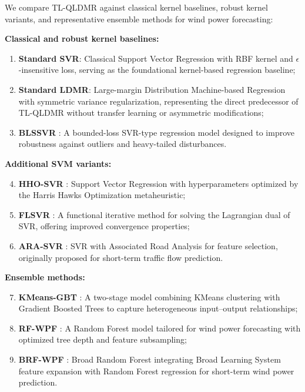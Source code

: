 We compare TL-QLDMR against classical kernel baselines, robust kernel variants, and representative ensemble methods for wind power forecasting:

\textbf{Classical and robust kernel baselines:}
\begin{enumerate}
    \item \textbf{Standard SVR}: Classical Support Vector Regression with RBF kernel and $\epsilon$-insensitive loss, serving as the foundational kernel-based regression baseline;
    \item \textbf{Standard LDMR}: Large-margin Distribution Machine-based Regression with symmetric variance regularization, representing the direct predecessor of TL-QLDMR without transfer learning or asymmetric modifications;
    \item \textbf{BLSSVR} \citep{fu2023bounded}: A bounded-loss SVR-type regression model designed to improve robustness against outliers and heavy-tailed disturbances.
\end{enumerate}

\textbf{Additional SVM variants:}
\begin{enumerate}
    \setcounter{enumi}{3}
    \item \textbf{HHO-SVR} \citep{houssein2025hho}: Support Vector Regression with hyperparameters optimized by the Harris Hawks Optimization metaheuristic;
    \item \textbf{FLSVR} \citep{meena2025flsvr}: A functional iterative method for solving the Lagrangian dual of SVR, offering improved convergence properties;
    \item \textbf{ARA-SVR} \citep{duan2025ara}: SVR with Associated Road Analysis for feature selection, originally proposed for short-term traffic flow prediction.
\end{enumerate}

\textbf{Ensemble methods:}
\begin{enumerate}
    \setcounter{enumi}{6}
    \item \textbf{KMeans-GBT} \citep{rizkallah2025kmeans}: A two-stage model combining KMeans clustering with Gradient Boosted Trees to capture heterogeneous input--output relationships;
    \item \textbf{RF-WPF} \citep{mustaffa2025rf}: A Random Forest model tailored for wind power forecasting with optimized tree depth and feature subsampling;
    \item \textbf{BRF-WPF} \citep{chen2025brf}: Broad Random Forest integrating Broad Learning System feature expansion with Random Forest regression for short-term wind power prediction.
\end{enumerate}


